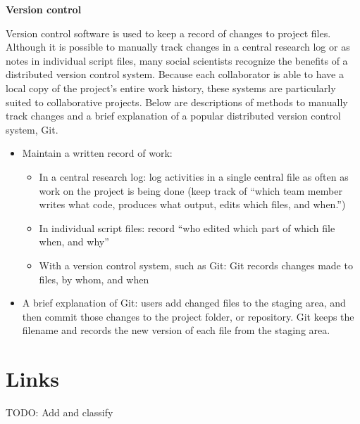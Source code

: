 \documentclass[]{book}
\providecommand{\tightlist}{%
  \setlength{\itemsep}{0pt}\setlength{\parskip}{0pt}}
\begin{document}
\textbf{Version control}

Version control software is used to keep a record of changes to project files. Although it is possible to manually track changes in a central research log or as notes in individual script files, many social scientists recognize the benefits of a distributed version control system. Because each collaborator is able to have a local copy of the project's entire work history, these systems are particularly suited to collaborative projects. Below are descriptions of methods to manually track changes and a brief explanation of a popular distributed version control system, Git.

\begin{itemize}
\tightlist
\item
  Maintain a written record of work:

  \begin{itemize}
  \tightlist
  \item
    In a central research log: log activities in a single central file as often as work on the project is being done (keep track of ``which team member writes what code, produces what output, edits which files, and when.'')
  \item
    In individual script files: record ``who edited which part of which file when, and why''
  \item
    With a version control system, such as Git: Git records changes made to files, by whom, and when
  \end{itemize}
\item
  A brief explanation of Git: users add changed files to the staging area, and then commit those changes to the project folder, or repository. Git keeps the filename and records the new version of each file from the staging area.
\end{itemize}

\hypertarget{links}{%
\section{Links}\label{links}}

TODO: Add and classify
\end{document}
